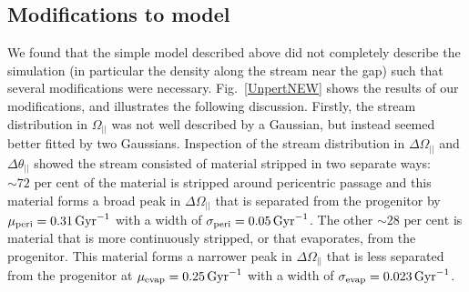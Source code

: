 \documentclass[useAMS,usenatbib,fleqn,a4paper]{mn2e}
\def\Gyr{\,{\rm Gyr}}
\def\percent{\text{ per cent}}
\def\percent{\text{ per cent}}
\providecommand{\DIFaddend}{} %
\begin{document}
\DIFaddend \subsection{Modifications to model}\label{Sect::modelmods}
We found that the simple model described above did not completely describe the simulation (in particular the density along the stream near the gap) such that several modifications were necessary. Fig.~\ref{UnpertNEW} shows the results of our modifications, and illustrates the following discussion. Firstly, the stream distribution in $\Omega_{||}$ was not well described by a Gaussian, but instead seemed better fitted by two Gaussians. Inspection of the stream distribution in $\Delta\Omega_{||}$ and $\Delta\theta_{||}$ showed the stream consisted of material stripped in two separate ways: $\sim72\percent$ of the material is stripped around pericentric passage and this material forms a broad peak in $\Delta\Omega_{||}$ that is separated from the progenitor by $\mu_\mathrm{peri}=0.31\Gyr^{-1}$ with a width of $\sigma_\mathrm{peri}=0.05\Gyr^{-1}$. The other $\sim28\percent$ is material that is more continuously stripped, or that evaporates, from the progenitor. This material forms a narrower peak in $\Delta\Omega_{||}$ that is less separated from the progenitor at $\mu_\mathrm{evap}=0.25\Gyr^{-1}$ with a width of $\sigma_\mathrm{evap}=0.023\Gyr^{-1}$.
\end{document}
